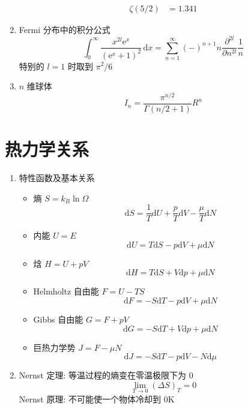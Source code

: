 \documentclass[12pt,a4paper]{article}%
\numberwithin{equation}{section}
\newcommand{\dif}{\mathrm{d}}
\newcommand{\diff}{\,\mathrm{d}}
\newcommand\e{\mathrm{e}}%
\begin{document}
\begin{multicols}{2}
\begin{enumerate}
\begin{align}
        \zeta(5/2) &= 1.341
    \end{align}
    \item Fermi 分布中的积分公式
    \begin{equation}\label{equ:fermi}
        \int_0^\infty\frac{x^{2l}\e^x}{(\e^x+1)^2}\diff x 
        =\sum_{n=1}^\infty (-)^{n+1}n\frac{\partial^{2l}}{\partial n^{2l}}\frac 1n
    \end{equation}
    特别的 $l=1$ 时取到 $\pi^2/6$
    \item $n$ 维球体
    \begin{equation}
        I_n = \frac{\pi^{n/2}}{\Gamma(n/2+1)}R^n
    \end{equation}
\end{enumerate}
\section{热力学关系} %
\label{sec:ThermoD}
\begin{enumerate}
    \item 特性函数及基本关系
    \begin{itemize}
        \item 熵 $S = k_B\ln\Omega$
        \begin{equation}
            \dif S = \frac 1T\dif U + \frac pT\dif V - \frac \mu T\dif N
        \end{equation}
        \item 内能 $U = E$
        \begin{equation}
            \dif U = T\dif S - p\dif V + \mu\dif N
        \end{equation}
        \item 焓 $H = U + pV$
        \begin{equation}
            \dif H = T\dif S + V\dif p + \mu\dif N
        \end{equation}
        \item Helmholtz 自由能 $F = U - TS$
        \begin{equation}
            \dif F = -S\dif T - p\dif V + \mu\dif N
        \end{equation}
        \item Gibbs 自由能 $G = F+pV$
        \begin{equation}
            \dif G = -S\dif T + V\dif p + \mu\dif N
        \end{equation}
        \item 巨热力学势 $J = F- \mu N$
        \begin{equation}
            \dif J = -S\dif T - p\dif V - N\dif \mu
        \end{equation}
    \end{itemize}
    \item Nernst 定理: 等温过程的熵变在零温极限下为 $0$
    \begin{equation}
        \lim_{T\to 0}\left(\Delta S\right)_T = 0
    \end{equation}
    Nernst 原理: 不可能使一个物体冷却到 $0$K%
\end{enumerate}
\end{multicols}
\end{document}
